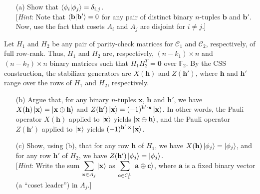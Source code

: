 \documentclass[11pt,a4paper]{article}
\def\a{\mathbf{a}}
\def\b{\mathbf{b}}
\def\c{\mathbf{c}}
\def\h{\mathbf{h}}
\def\x{\mathbf{x}}
\def\F{{\mathbb F}}
\def\cC{\mathcal{C}}
\begin{document}
\begin{enumerate}
\begin{itemize}
\item[(a)] Show that $\braket{\phi_i | \phi_j} = \delta_{i,j}$. \\ {[\emph{Hint\/}: Note that $\braket{\b|\b'} = 0$ for any pair of distinct binary $n$-tuples  $\b$ and $\b'$. Now, use the fact that cosets $A_i$ and $A_j$ are disjoint for $i \ne j$.]} 
\end{itemize}

Let $H_1$ and $H_2$ be any pair of parity-check matrices for $\cC_1$ and $\cC_2$, respectively, of full row-rank. Thus, $H_1$ and $H_2$ are, respectively, $(n-k_1) \times n$ and $(n-k_2) \times n$ binary matrices such that $H_1 H_2^T = \boldsymbol{0}$ over $\F_2$. By the CSS construction, the stabilizer generators are $X(\h)$ and $Z(\h')$, where $\h$ and $\h'$ range over the rows of $H_1$ and $H_2$, respectively.

\begin{itemize}
\item[(b)]  Argue that, for any binary $n$-tuples $\x$, $\h$ and $\h'$, we have $X(\h)\ket{\x} = \ket{\x \oplus \h}$ and $Z(\h') \ket{\x} = (-1)^{\h' \cdot \x}\ket{\x}$. In other words, the Pauli operator $X(\h)$ applied to $\ket{\x}$ yields $\ket{\x \oplus \h}$, and the Pauli operator $Z(\h')$ applied to $\ket{\x}$ yields $(-1)^{\h' \cdot \x}\ket{\x}$.
\item[(c)] Show, using (b), that for any row $\h$ of $H_1$, we have $X(\h) \ket{\phi_j} = \ket{\phi_j}$, and for any row $\h'$ of $H_2$, we have $Z(\h') \ket{\phi_j} = \ket{\phi_j}$. \\ {[\emph{Hint\/}: Write the sum $\displaystyle \sum\limits_{\x \in A_j} \ket{\x}$ as $\displaystyle \sum\limits_{\c \in \cC_1^\perp} \ket{\a \oplus \c}$, where $\a$ is a fixed binary vector (a ``coset leader'') in $A_j$.]}
\end{itemize}

\end{enumerate}
\end{document}
